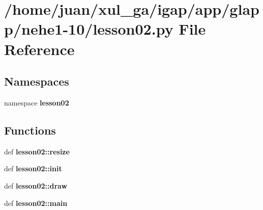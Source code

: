 \section{/home/juan/xul\_\-ga/igap/app/glapp/nehe1-10/lesson02.py File Reference}
\label{nehe1-10_2lesson02_8py}
\subsection*{Namespaces}
\begin{CompactItemize}
\item 
namespace {\bf lesson02}
\end{CompactItemize}
\subsection*{Functions}
\begin{CompactItemize}
\item 
def {\bf lesson02::resize}
\item 
def {\bf lesson02::init}
\item 
def {\bf lesson02::draw}
\item 
def {\bf lesson02::main}
\end{CompactItemize}
